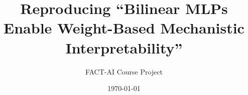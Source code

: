 \documentclass[10pt]{beamer}
\title{Reproducing ``Bilinear MLPs Enable Weight-Based Mechanistic Interpretability''}
\author{FACT-AI Course Project}
\date{\today}
\begin{document}
\begin{frame}
    \titlepage
\end{frame}





\end{document}
